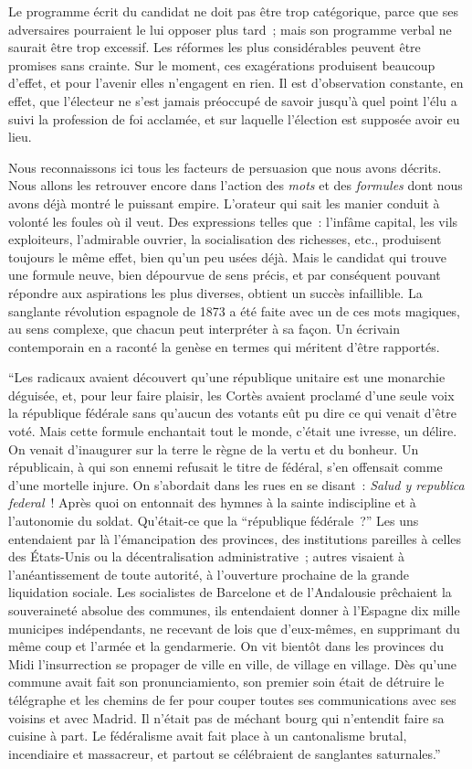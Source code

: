\documentclass[french,twoside]{book} %
\begin{document}
Le programme écrit du candidat ne doit pas être trop catégorique, parce que ses adversaires pourraient le lui opposer plus tard ; mais son programme verbal ne sau­rait être trop excessif. Les réformes les plus considérables peuvent être promises sans crainte. Sur le moment, ces exagérations produisent beaucoup d’effet, et pour l’avenir elles n’engagent en rien. Il est d’observation constante, en effet, que l’électeur ne s’est jamais préoccupé de savoir jusqu’à quel point l’élu a suivi la profession de foi acclamée, et sur laquelle l’élection est supposée avoir eu lieu.\par
Nous reconnaissons ici tous les facteurs de persuasion que nous avons décrits. Nous allons les retrouver encore dans l’action des \emph{mots} et des \emph{formules} dont nous avons déjà montré le puissant empire. L’orateur qui sait les manier conduit à volonté les foules où il veut. Des expressions telles que : l’infâme capital, les vils exploi­teurs, l’admirable ouvrier, la socialisation des richesses, etc., produisent toujours le même effet, bien qu’un peu usées déjà. Mais le candidat qui trouve une formule neuve, bien dépourvue de sens précis, et par conséquent pouvant répondre aux aspira­tions les plus diverses, obtient un succès infaillible. La sanglante révolution espagnole de 1873 a été faite avec un de ces mots magiques, au sens complexe, que chacun peut interpréter à sa façon. Un écrivain contemporain en a raconté la genèse en termes qui méritent d’être rapportés.\par
“Les radicaux avaient découvert qu’une république unitaire est une monarchie déguisée, et, pour leur faire plaisir, les Cortès avaient proclamé d’une seule voix la république fédérale sans qu’aucun des votants eût pu dire ce qui venait d’être voté. Mais cette formule enchantait tout le monde, c’était une ivresse, un délire. On venait d’inaugurer sur la terre le règne de la vertu et du bonheur. Un républicain, à qui son ennemi refusait le titre de fédéral, s’en offensait comme d’une mortelle injure. On s’abordait dans les rues en se disant : \emph{Salud y republica federal} ! Après quoi on entonnait des hymnes à la sainte indiscipline et à l’autonomie du soldat. Qu’était-ce que la “république fédérale ?” Les uns entendaient par là l’émancipation des provin­ces, des institutions pareilles à celles des États-Unis ou la décentralisation adminis­trative ; autres visaient à l’anéantissement de toute autorité, à l’ouverture prochaine de la grande liquidation sociale. Les socialistes de Barcelone et de l’Andalousie prêchaient la souveraineté absolue des communes, ils entendaient donner à l’Espagne dix mille municipes indépendants, ne recevant de lois que d’eux-mêmes, en suppri­mant du même coup et l’armée et la gendarmerie. On vit bientôt dans les provinces du Midi l’insurrection se propager de ville en ville, de village en village. Dès qu’une commune avait fait son pronunciamiento, son premier soin était de détruire le télégraphe et les chemins de fer pour couper toutes ses communications avec ses voisins et avec Madrid. Il n’était pas de méchant bourg qui n’entendit faire sa cuisine à part. Le fédéralisme avait fait place à un cantonalisme brutal, incendiaire et massa­creur, et partout se célébraient de sanglantes saturnales.”\par
\end{document}
